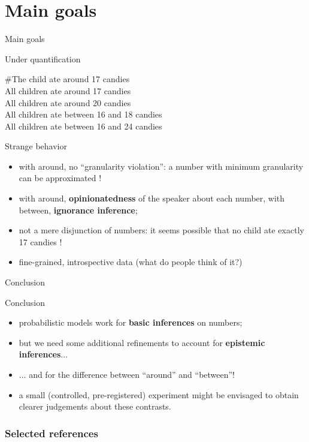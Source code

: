 \documentclass[xcolor=table, hyperref={pdfpagelabels=false}]{beamer}
\begin{document}
\section{Main goals}
\begin{frame}{}
\begin{center}
	\Huge Main goals
\end{center}
\end{frame}

\begin{frame}{Under quantification}
\begin{center}
	\#The child ate around 17 candies \\ \vspace{2mm}
	All children ate around 17 candies \\
	All children ate around 20 candies \\ \vspace{2mm}
	All children ate between 16 and 18 candies \\
	All children ate between 16 and 24 candies \\
\end{center}
\begin{alertblock}{Strange behavior}
	\begin{itemize}
		\item with around, no ``granularity violation'': a number with minimum granularity can be approximated !\pause
		\item with around, \textbf{opinionatedness} of the speaker about each number, with between, \textbf{ignorance inference};\pause
		\item not a mere disjunction of numbers: it seems possible that no child ate exactly 17 candies !\pause
		\item fine-grained, introspective data (what do people think of it?)
	\end{itemize}
\end{alertblock}
\end{frame}
\begin{frame}{Conclusion}
\begin{block}{Conclusion}
	\begin{itemize}
		\item probabilistic models work for \textbf{basic inferences} on numbers;\pause
		\item but we need some additional refinements to account for \textbf{epistemic inferences}...\pause
		\item ... and for the difference between ``around'' and ``between''!\pause
		\item a small (controlled, pre-registered) experiment might be envisaged to obtain clearer judgements about these contrasts.
	\end{itemize}
\end{block}
\end{frame}
\begin{frame}[allowframebreaks]
\frametitle{Selected references}
\nocite{*}

\printbibliography
\end{frame}
\end{document}
